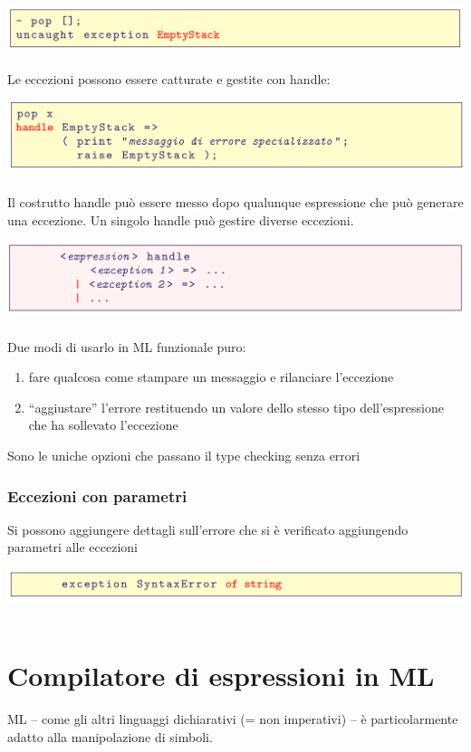 \documentclass[10pt]{article}
\begin{document}
\includegraphics[scale=0.2]{Immagini/ml54.png}
\\\\
Le eccezioni possono essere catturate e gestite con handle:

\includegraphics[scale=0.2]{Immagini/ml55.png}
\\\\
Il costrutto handle può essere messo dopo qualunque espressione che può generare
una eccezione.
Un singolo handle può gestire diverse eccezioni.

\includegraphics[scale=0.2]{Immagini/ml56.png}
\\\\
Due modi di usarlo in ML funzionale puro:
\begin{enumerate}
    \item fare qualcosa come stampare un messaggio e rilanciare l’eccezione
    \item “aggiustare” l’errore restituendo un valore dello stesso tipo
dell’espressione che ha sollevato l’eccezione
\end{enumerate}
Sono le uniche opzioni che passano il type checking senza errori
\subsubsection{Eccezioni con parametri}
Si possono aggiungere dettagli sull’errore che si è verificato
aggiungendo parametri alle eccezioni

\includegraphics[scale=0.2]{Immagini/ml57.png}
\\\\
\section{Compilatore di espressioni in ML}
ML – come gli altri linguaggi dichiarativi (= non imperativi) – è
particolarmente adatto alla manipolazione di simboli.
\end{document}
